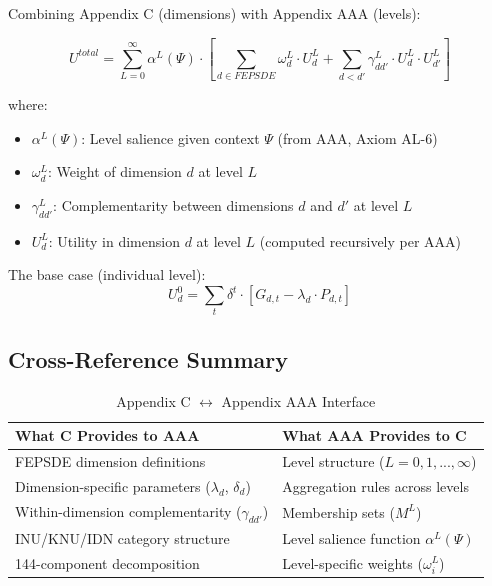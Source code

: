 \begin{tcolorbox}[colback=blue!5!white, colframe=blue!75!black, 
    title=The Complete EBF Utility Structure]

Combining Appendix C (dimensions) with Appendix AAA (levels):

\begin{equation}
\boxed{
U^{total} = \sum_{L=0}^{\infty} \alpha^L(\Psi) \cdot \left[ \sum_{d \in FEPSDE} \omega^L_d \cdot U^L_d + \sum_{d < d'} \gamma^L_{dd'} \cdot U^L_d \cdot U^L_{d'} \right]
}
\end{equation}

where:
\begin{itemize}[nosep]
\item $\alpha^L(\Psi)$: Level salience given context $\Psi$ (from AAA, Axiom AL-6)
\item $\omega^L_d$: Weight of dimension $d$ at level $L$
\item $\gamma^L_{dd'}$: Complementarity between dimensions $d$ and $d'$ at level $L$
\item $U^L_d$: Utility in dimension $d$ at level $L$ (computed recursively per AAA)
\end{itemize}

The base case (individual level):
\begin{equation}
U^0_d = \sum_t \delta^t \cdot [G_{d,t} - \lambda_d \cdot P_{d,t}]
\end{equation}
\end{tcolorbox}

\subsection{Cross-Reference Summary}

\begin{table}[htbp]
\centering
\caption{Appendix C $\leftrightarrow$ Appendix AAA Interface}
\label{tab:app-c-aaa-interface}
\renewcommand{\arraystretch}{1.3}
\begin{tabular}{@{}p{6cm}p{6cm}@{}}
\toprule
\textbf{What C Provides to AAA} & \textbf{What AAA Provides to C} \\
\midrule
FEPSDE dimension definitions & Level structure ($L = 0, 1, ..., \infty$) \\
Dimension-specific parameters ($\lambda_d$, $\delta_d$) & Aggregation rules across levels \\
Within-dimension complementarity ($\gamma_{dd'}$) & Membership sets ($M^L$) \\
INU/KNU/IDN category structure & Level salience function $\alpha^L(\Psi)$ \\
144-component decomposition & Level-specific weights ($\omega^L_i$) \\
\bottomrule
\end{tabular}
\end{table}

